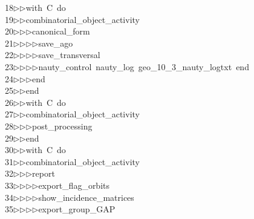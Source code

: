 \begin{tabbing}
18\>$\triangleright$\>$\triangleright$\>with\ C\ do\ \\[0pt]
19\>$\triangleright$\>$\triangleright$\>combinatorial\_object\_activity\ \\[0pt]
20\>$\triangleright$\>$\triangleright$\>$\triangleright$\>canonical\_form\ \\[0pt]
21\>$\triangleright$\>$\triangleright$\>$\triangleright$\>$\triangleright$\>save\_ago\ \\[0pt]
22\>$\triangleright$\>$\triangleright$\>$\triangleright$\>$\triangleright$\>save\_transversal\ \\[0pt]
23\>$\triangleright$\>$\triangleright$\>$\triangleright$\>$\triangleright$\>nauty\_control\ nauty\_log\ geo\_10\_3\_nauty\_logtxt\ end\ \\[0pt]
24\>$\triangleright$\>$\triangleright$\>$\triangleright$\>end\ \\[0pt]
25\>$\triangleright$\>$\triangleright$\>end\ \\[0pt]
26\>$\triangleright$\>$\triangleright$\>with\ C\ do\ \\[0pt]
27\>$\triangleright$\>$\triangleright$\>combinatorial\_object\_activity\ \\[0pt]
28\>$\triangleright$\>$\triangleright$\>$\triangleright$\>post\_processing\ \\[0pt]
29\>$\triangleright$\>$\triangleright$\>end\ \\[0pt]
30\>$\triangleright$\>$\triangleright$\>with\ C\ do\ \\[0pt]
31\>$\triangleright$\>$\triangleright$\>combinatorial\_object\_activity\ \\[0pt]
32\>$\triangleright$\>$\triangleright$\>$\triangleright$\>report\ \\[0pt]
33\>$\triangleright$\>$\triangleright$\>$\triangleright$\>$\triangleright$\>export\_flag\_orbits\ \\[0pt]
34\>$\triangleright$\>$\triangleright$\>$\triangleright$\>$\triangleright$\>show\_incidence\_matrices\ \\[0pt]
35\>$\triangleright$\>$\triangleright$\>$\triangleright$\>$\triangleright$\>export\_group\_GAP\ \\[0pt]

\end{tabbing}
